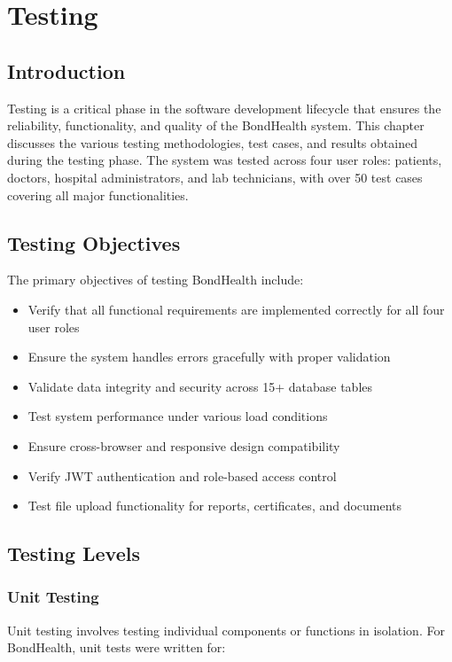 \chapter{Testing}

\section{Introduction}
Testing is a critical phase in the software development lifecycle that ensures the reliability, functionality, and quality of the BondHealth system. This chapter discusses the various testing methodologies, test cases, and results obtained during the testing phase. The system was tested across four user roles: patients, doctors, hospital administrators, and lab technicians, with over 50 test cases covering all major functionalities.

\section{Testing Objectives}
The primary objectives of testing BondHealth include:

\begin{itemize}
    \item Verify that all functional requirements are implemented correctly for all four user roles
    \item Ensure the system handles errors gracefully with proper validation
    \item Validate data integrity and security across 15+ database tables
    \item Test system performance under various load conditions
    \item Ensure cross-browser and responsive design compatibility
    \item Verify JWT authentication and role-based access control
    \item Test file upload functionality for reports, certificates, and documents
\end{itemize}

\section{Testing Levels}

\subsection{Unit Testing}
Unit testing involves testing individual components or functions in isolation. For BondHealth, unit tests were written for:

